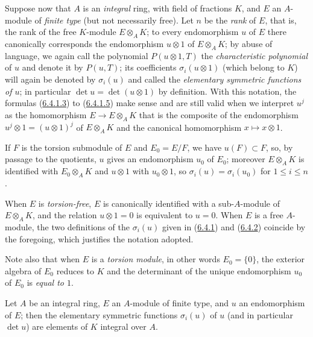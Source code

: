 \begin{env}[6.4.2]
\label{II.6.4.2}
Suppose now that $A$ is an \emph{integral} ring, with field of fractions
$K$, and $E$ an $A$-module of \emph{finite type} (but not necessarily
free). Let $n$ be the \emph{rank} of $E$, that is, the rank of the free
$K$-module $E\otimes_AK$; to every endomorphism $u$ of $E$ there canonically
corresponds the endomorphism $u\otimes1$ of $E\otimes_AK$; by abuse of
language, we again call the polynomial $P(u\otimes1,T)$ the
\emph{characteristic polynomial} of $u$ and denote it by $P(u,T)$; its
coefficients $\sigma_i(u\otimes1)$ (which belong to $K$) will again be
denoted by $\sigma_i(u)$ and called the \emph{elementary symmetric functions
of $u$}; in particular $\det u=\det(u\otimes1)$ by definition. With this
notation, the formulas (\hyperref[II.6.4.1.3]{6.4.1.3}) to
(\hyperref[II.6.4.1.5]{6.4.1.5}) make sense and are still valid when we
interpret $u^j$ as the homomorphism $E\to E\otimes_AK$ that is the composite
of the endomorphism $u^j\otimes1=(u\otimes1)^j$ of $E\otimes_AK$ and the
canonical homomorphism $x\mapsto x\otimes1$.

If $F$ is the torsion submodule of $E$ and $E_0=E/F$, we have
$u(F)\subset F$, so, by passage to the quotients, $u$ gives an endomorphism
$u_0$ of $E_0$; moreover $E\otimes_AK$ is identified with $E_0\otimes_AK$ and
$u\otimes1$ with $u_0\otimes1$, so $\sigma_i(u)=\sigma_i(u_0)$ for
$1\leq i\leq n$.

When $E$ is \emph{torsion-free}, $E$ is canonically identified with a
sub-$A$-module of $E\otimes_AK$, and the relation $u\otimes1=0$ is
equivalent to $u=0$. When $E$ is a free $A$-module, the two definitions of
the $\sigma_i(u)$ given in (\hyperref[II.6.4.1]{6.4.1}) and
(\hyperref[II.6.4.2]{6.4.2}) coincide by the foregoing, which justifies
the notation adopted.

Note also that when $E$ is a \emph{torsion module}, in other words
$E_0=\{0\}$, the exterior algebra of $E_0$ reduces to $K$ and the
determinant of the unique endomorphism $u_0$ of $E_0$ is \emph{equal to
$1$}.
\end{env}

\begin{proposition}[6.4.3]
\label{II.6.4.3}
Let $A$ be an integral ring, $E$ an $A$-module of finite type, and $u$ an
endomorphism of $E$; then the elementary symmetric functions $\sigma_i(u)$
of $u$ (and in particular $\det u$) are elements of $K$ integral over $A$.
\end{proposition}

